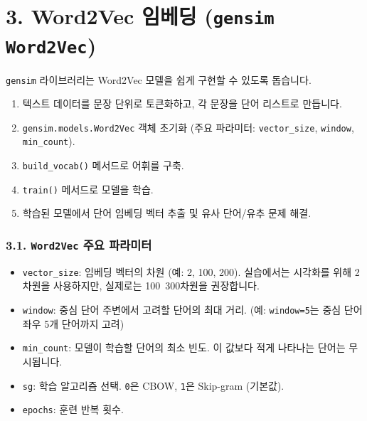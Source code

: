 \documentclass[11pt,a4paper]{article}
\theoremstyle{definition}
\newcommand{\newsection}[1]{\newpage\section{#1}}
\begin{document}
\newsection{3. Word2Vec 임베딩 (\texttt{gensim} \texttt{Word2Vec})}
\texttt{gensim} 라이브러리는 Word2Vec 모델을 쉽게 구현할 수 있도록 돕습니다.

\begin{tcolorbox}[examplebox, title=📖 Word2Vec 임베딩 기본 절차]
\begin{enumerate}
    \item 텍스트 데이터를 문장 단위로 토큰화하고, 각 문장을 단어 리스트로 만듭니다.
    \item \texttt{gensim.models.Word2Vec} 객체 초기화 (주요 파라미터: \texttt{vector\_size}, \texttt{window}, \texttt{min\_count}).
    \item \texttt{build\_vocab()} 메서드로 어휘를 구축.
    \item \texttt{train()} 메서드로 모델을 학습.
    \item 학습된 모델에서 단어 임베딩 벡터 추출 및 유사 단어/유추 문제 해결.
\end{enumerate}
\end{tcolorbox}

\subsubsection{3.1. \texttt{Word2Vec} 주요 파라미터}
\begin{itemize}
    \item \texttt{vector\_size}: 임베딩 벡터의 차원 (예: 2, 100, 200). 실습에서는 시각화를 위해 2차원을 사용하지만, 실제로는 100~300차원을 권장합니다.
    \item \texttt{window}: 중심 단어 주변에서 고려할 단어의 최대 거리. (예: \texttt{window=5}는 중심 단어 좌우 5개 단어까지 고려)
    \item \texttt{min\_count}: 모델이 학습할 단어의 최소 빈도. 이 값보다 적게 나타나는 단어는 무시됩니다.
    \item \texttt{sg}: 학습 알고리즘 선택. \texttt{0}은 CBOW, \texttt{1}은 Skip-gram (기본값).
    \item \texttt{epochs}: 훈련 반복 횟수.
\end{itemize}
\end{document}
